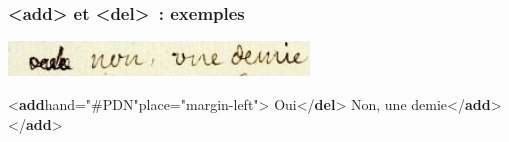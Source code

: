 \documentclass[]{beamer}\makeatletter
\begin{document}
\begin{frame}[fragile]
\frametitle{{\color{blue2}<add>} et {\color{blue2}<del>} : exemples}\par
      \includegraphics[width=8cm,]{../Graphics/O-1-extrait.jpg}     \par
      
\bgroup\ttfamily\fontsize{8.5pt}{9pt}\selectfont\par
\begin{exampleblock}{}
\noindent\ttfamily\mbox{}{\color{blue1}<\textbf{add}\hspace*{6pt}hand="{\color{blue2}#PDN}"\hspace*{6pt}place="{\color{blue2}margin-left}">}\mbox{}\newline 
{}\mbox{}\newline 
\hspace*{6pt}Oui{\color{blue1}</\textbf{del}>}\mbox{}\newline 
\hspace*{6pt}Non, une demie{\color{blue1}</\textbf{add}>}\mbox{}\newline 
{}\mbox{}\newline 
{\color{blue1}</\textbf{add}>}
\end{exampleblock}
\par\egroup
       
\end{frame}
\end{document}
